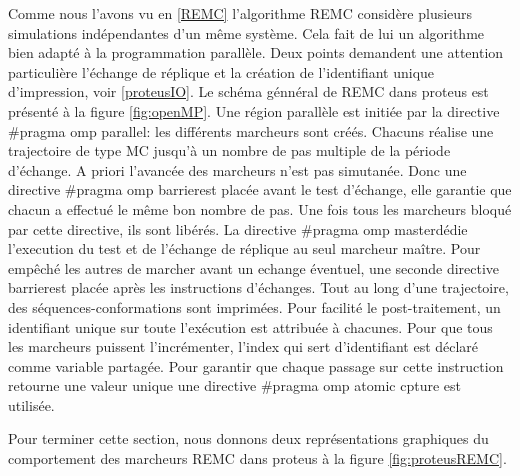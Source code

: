 Comme nous l'avons vu en \ref{REMC} l'algorithme REMC considère plusieurs simulations indépendantes d'un même système. Cela fait de lui un algorithme bien adapté à la programmation parallèle. Deux points demandent une attention particulière l'échange de réplique et la création de l'identifiant unique d'impression, voir \ref{proteusIO}. Le schéma génnéral de REMC dans proteus est présenté à la figure  \ref{fig:openMP}. Une région parallèle est initiée par la directive \og #pragma omp parallel\fg: les différents marcheurs sont créés. Chacuns réalise une trajectoire de type MC jusqu'à un nombre de pas multiple de la période d'échange. A priori l'avancée des marcheurs n'est pas simutanée. Donc une directive \og #pragma omp barrier\fg est placée avant le test d'échange, elle garantie que chacun a effectué le même bon nombre de pas. Une fois tous les marcheurs bloqué par cette directive, ils sont libérés. La directive \og #pragma omp master\fg dédie l'execution du test et de l'échange de réplique au seul marcheur maître. Pour empêché les autres de marcher avant un echange éventuel, une seconde directive \og barrier\fg est placée après les instructions d'échanges. Tout au long d'une trajectoire, des séquences-conformations sont imprimées. Pour facilité le post-traitement, un identifiant unique sur toute l'exécution est attribuée à chacunes. Pour que tous les marcheurs puissent l'incrémenter, l'index qui sert d'identifiant est déclaré comme variable partagée. Pour garantir que chaque passage sur cette instruction retourne une valeur unique une directive \og#pragma omp atomic cpture \fg est utilisée.


Pour terminer cette section, nous donnons deux représentations graphiques du comportement des marcheurs REMC dans proteus à la figure \ref{fig:proteusREMC}.  

